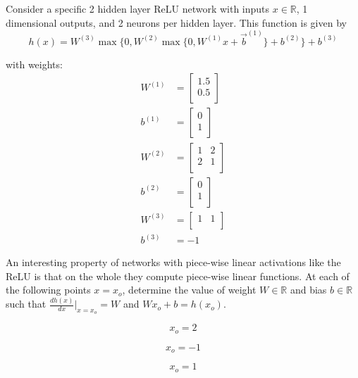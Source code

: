 Consider a specific 2 hidden layer ReLU network with inputs $x \in \mathbb{R}$, 1 dimensional outputs, and
2 neurons per hidden layer. This function is given by
\begin{equation}
    h(x) = W^{(3)}\max\{0, W^{(2)} \max\{0, W^{(1)} x + \vec{b}^{(1)}\} + b^{(2)}\} + b^{(3)}    
\end{equation}

with weights:
\begin{align}
W^{(1)} &= \begin{bmatrix}
        1.5 \\
        0.5 \\
    \end{bmatrix} \\
b^{(1)} &= \begin{bmatrix}
        0 \\
        1 \\
        \end{bmatrix} \\
W^{(2)} &= \begin{bmatrix}
        1 & 2 \\
        2 & 1 \\
        \end{bmatrix} \\
b^{(2)} &= \begin{bmatrix}
        0 \\
        1 \\
        \end{bmatrix} \\
W^{(3)} &= \begin{bmatrix}
        1 & 1 \\
        \end{bmatrix} \\
b^{(3)} &= -1
\end{align}

An interesting property of networks with piece-wise linear activations like the ReLU
is that on the whole they compute piece-wise linear functions.
At each of the following points $x=x_o$,  determine the value of weight $W \in \mathbb{R}$ and bias $b \in \mathbb{R}$ such that $\frac{dh(x)}{dx}\rvert_{x=x_o} = W$ and $Wx_o + b = h(x_o)$.



\begin{equation}
    x_o = 2
\end{equation}

\begin{equation}
    x_o = -1
\end{equation}

\begin{equation}
    x_o = 1
\end{equation}
